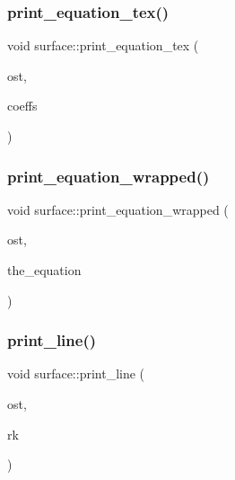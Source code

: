 \mbox{\label{classsurface_aa34415699d6d3ac6e6e8c76fa9a01259}} 
\subsubsection{\texorpdfstring{print\+\_\+equation\+\_\+tex()}{print\_equation\_tex()}}
{\footnotesize\ttfamily void surface\+::print\+\_\+equation\+\_\+tex (\begin{DoxyParamCaption}\item[{ostream \&}]{ost,  }\item[{\mbox{\hyperlink{galois_8h_a09fddde158a3a20bd2dcadb609de11dc}{I\+NT}} $\ast$}]{coeffs }\end{DoxyParamCaption})}

\mbox{\label{classsurface_add5ce9397ddae1367f5d10ad8c19aeab}} 
\subsubsection{\texorpdfstring{print\+\_\+equation\+\_\+wrapped()}{print\_equation\_wrapped()}}
{\footnotesize\ttfamily void surface\+::print\+\_\+equation\+\_\+wrapped (\begin{DoxyParamCaption}\item[{ostream \&}]{ost,  }\item[{\mbox{\hyperlink{galois_8h_a09fddde158a3a20bd2dcadb609de11dc}{I\+NT}} $\ast$}]{the\+\_\+equation }\end{DoxyParamCaption})}

\mbox{\label{classsurface_a3c3b2848519e60d214db736b4e397789}} 
\subsubsection{\texorpdfstring{print\+\_\+line()}{print\_line()}}
{\footnotesize\ttfamily void surface\+::print\+\_\+line (\begin{DoxyParamCaption}\item[{ostream \&}]{ost,  }\item[{\mbox{\hyperlink{galois_8h_a09fddde158a3a20bd2dcadb609de11dc}{I\+NT}}}]{rk }\end{DoxyParamCaption})}


